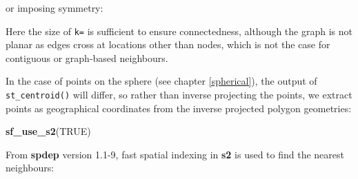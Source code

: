 \documentclass[]{book}
\newenvironment{Shaded}{\begin{snugshade}}{\end{snugshade}}
\newcommand{\CommentTok}[1]{\textcolor[rgb]{0.56,0.35,0.01}{\textit{#1}}}
\newcommand{\DataTypeTok}[1]{\textcolor[rgb]{0.13,0.29,0.53}{#1}}
\newcommand{\KeywordTok}[1]{\textcolor[rgb]{0.13,0.29,0.53}{\textbf{#1}}}
\newcommand{\NormalTok}[1]{#1}
\newcommand{\OperatorTok}[1]{\textcolor[rgb]{0.81,0.36,0.00}{\textbf{#1}}}
\newcommand{\OtherTok}[1]{\textcolor[rgb]{0.56,0.35,0.01}{#1}}
\newcommand{\StringTok}[1]{\textcolor[rgb]{0.31,0.60,0.02}{#1}}
\begin{document}
or imposing symmetry:

\begin{Shaded}
\end{Shaded}

Here the size of \texttt{k=} is sufficient to ensure connectedness, although the graph is not planar as edges cross at locations other than nodes, which is not the case for contiguous or graph-based neighbours.

\begin{Shaded}
\end{Shaded}

In the case of points on the sphere (see chapter \ref{spherical}), the output of \texttt{st\_centroid()} will differ, so rather than inverse projecting the points, we extract points as geographical coordinates from the inverse projected polygon geometries:

\begin{Shaded}
\begin{Highlighting}[]
\KeywordTok{sf_use_s2}\NormalTok{(}\OtherTok{TRUE}\NormalTok{)}
\end{Highlighting}
\end{Shaded}

\begin{Shaded}
\end{Shaded}

From \textbf{spdep} version 1.1-9, fast spatial indexing in \textbf{s2} is used to find the nearest neighbours:
\end{document}
